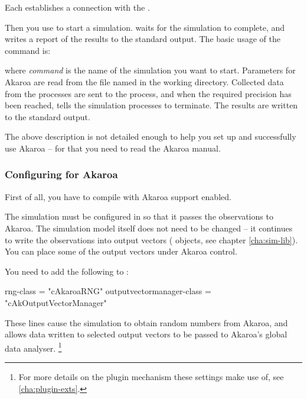 Each  establishes a connection with the .

Then you use  to start a simulation.  waits
for the simulation to complete, and writes a report of the results
to the standard output. The basic usage of the  command is:


where \textit{command} is the name of the simulation you want to start.
Parameters for Akaroa are read from the file named  in
the working directory. Collected data from the processes are
sent to the  process, and when the required precision
has been reached,  tells the simulation processes to
terminate. The results are written to the standard output.

The above description is not detailed enough to help you
set up and successfully use Akaroa -- for that you need to read the
Akaroa manual.

\subsubsection{Configuring {\opp} for Akaroa}
\label{sec:run-sim:configuring-akaroa}

First of all, you have to compile {\opp} with Akaroa support enabled.

The {\opp} simulation must be configured in 
so that it passes the observations to Akaroa. The simulation model itself does
not need to be changed -- it continues to write
the observations into output vectors ( objects,
see chapter \ref{cha:sim-lib}). You can place some of
the output vectors under Akaroa control.

You need to add the following to :

\begin{inifile}
[General]
rng-class = "cAkaroaRNG"
outputvectormanager-class = "cAkOutputVectorManager"
\end{inifile}

These lines cause the simulation to obtain random numbers from Akaroa,
and allows data written to selected output vectors to be passed to Akaroa's
global data analyser.
    \footnote{For more details on the plugin mechanism these settings make use of,
    see \ref{cha:plugin-exts}.}

